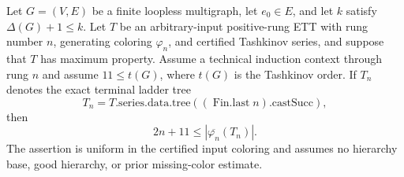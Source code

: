 \begin{theorem}
Let $G=(V,E)$ be a finite loopless multigraph, let $e_0\in E$, and let
$k$ satisfy $\Delta(G)+1\leq k$.  Let $T$ be an arbitrary-input
positive-rung ETT with rung number $n$, generating coloring $\varphi_n$,
and certified Tashkinov series, and suppose that $T$ has maximum property.
Assume a technical induction context through rung $n$ and assume
$11\leq t(G)$, where $t(G)$ is the Tashkinov order.  If $T_n$ denotes
the exact terminal ladder tree
\[
 T_n=T.\mathrm{series.data.tree}
       ((\operatorname{Fin.last}n).\mathrm{castSucc}),
\]
then
\[
 2n+11\leq |\overline{\varphi_n}(T_n)|.
\]
The assertion is uniform in the certified input coloring and assumes no
hierarchy base, good hierarchy, or prior missing-color estimate.
\end{theorem}
